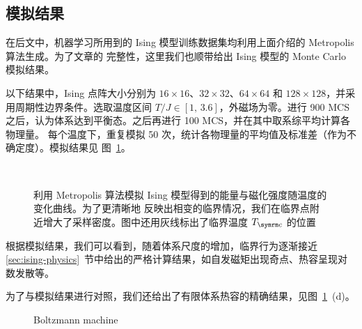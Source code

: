 \subsection{模拟结果}

在后文中，机器学习所用到的 Ising 模型训练数据集均利用上面介绍的 Metropolis 算法生成。为了文章的
完整性，这里我们也顺带给出 Ising 模型的 Monte Carlo 模拟结果。

以下结果中，Ising 点阵大小分别为 $16 \times 16$、$32 \times 32$、$64 \times 64$ 和
$128 \times 128$，并采用周期性边界条件。选取温度区间 $T/J \in [1,\,3.6]$，外磁场为零。进行
\num{900} MCS 之后，认为体系达到平衡态。之后再进行 \num{100} MCS，并在其中取系综平均计算各物理量。
每个温度下，重复模拟 50 次，统计各物理量的平均值及标准差（作为不确定度）。模拟结果见
图~\ref{fig:ising-e-m}。

\begin{figure}[htb]
  \begin{subfigure}[b]{0.47\textwidth}
    \hfill
  \end{subfigure}
  \begin{subfigure}[b]{0.47\textwidth}
    \hfill
  \end{subfigure}
  \\[3ex]
  \begin{subfigure}[b]{0.47\textwidth}
    \hfill
  \end{subfigure}
  \begin{subfigure}[b]{0.47\textwidth}
    \hfill
  \end{subfigure}
  \caption{利用 Metropolis 算法模拟 Ising 模型得到的能量与磁化强度随温度的变化曲线。为了更清晰地
    反映出相变的临界情况，我们在临界点附近增大了采样密度。图中还用灰线标出了临界温度 $\Tc$ 的位置}
  \label{fig:ising-e-m}
\end{figure}

根据模拟结果，我们可以看到，随着体系尺度的增加，临界行为逐渐接近 \ref{sec:ising-physics}~节中给出的严格计算结果，如自发磁矩出现奇点、热容呈现对数发散等。

为了与模拟结果进行对照，我们还给出了有限体系热容的精确结果，见图~\ref{fig:ising-e-m}~(d)。

\begin{figure}
  \begin{subfigure}[b]{0.47\textwidth}
    \hfill
  \end{subfigure}
  \begin{subfigure}[b]{0.47\textwidth}
    \hfill
  \end{subfigure}
  \caption{Boltzmann machine}
\end{figure}

